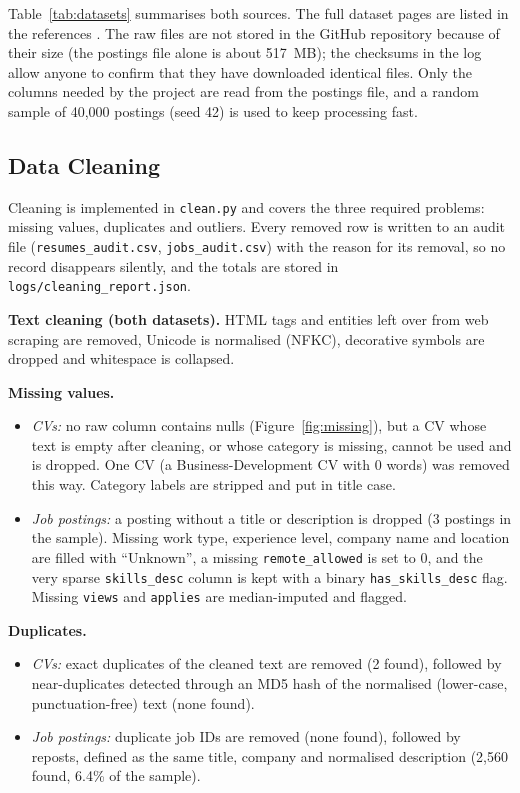 \documentclass[11pt,a4paper]{article}
\begin{document}
Table~\ref{tab:datasets} summarises both sources. The full dataset
pages are listed in the references \cite{kaggle_resume,kaggle_jobs}. The
raw files are not stored in the GitHub repository because of their size
(the postings file alone is about 517~MB); the checksums in the log allow
anyone to confirm that they have downloaded identical files. Only the
columns needed by the project are read from the postings file, and a
random sample of 40{,}000 postings (seed 42) is used to keep processing
fast.

\subsection{Data Cleaning}
\label{sec:cleaning}

Cleaning is implemented in \texttt{clean.py} and covers the three
required problems: missing values, duplicates and outliers. Every
removed row is written to an audit file (\texttt{resumes\_audit.csv},
\texttt{jobs\_audit.csv}) with the reason for its removal, so no record
disappears silently, and the totals are stored in
\texttt{logs/cleaning\_report.json}.

\textbf{Text cleaning (both datasets).} HTML tags and entities left over
from web scraping are removed, Unicode is normalised (NFKC), decorative
symbols are dropped and whitespace is collapsed.

\textbf{Missing values.}
\begin{itemize}
  \item \emph{CVs:} no raw column contains nulls (Figure~\ref{fig:missing}),
  but a CV whose text is empty after cleaning, or whose category is
  missing, cannot be used and is dropped. One CV (a Business-Development
  CV with 0 words) was removed this way. Category labels are stripped
  and put in title case.
  \item \emph{Job postings:} a posting without a title or description
  is dropped (3 postings in the sample). Missing work type, experience
  level, company name and location are filled with ``Unknown'', a
  missing \texttt{remote\_allowed} is set to 0, and the very sparse
  \texttt{skills\_desc} column is kept with a binary
  \texttt{has\_skills\_desc} flag. Missing \texttt{views} and
  \texttt{applies} are median-imputed and flagged.
\end{itemize}

\textbf{Duplicates.}
\begin{itemize}
  \item \emph{CVs:} exact duplicates of the cleaned text are removed
  (2 found), followed by near-duplicates detected through an MD5 hash of
  the normalised (lower-case, punctuation-free) text (none found).
  \item \emph{Job postings:} duplicate job IDs are removed (none found),
  followed by reposts, defined as the same title, company and normalised
  description (2{,}560 found, 6.4\% of the sample).
\end{itemize}
\end{document}
